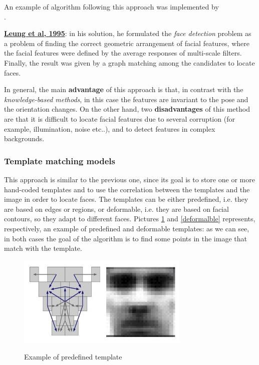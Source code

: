  An example of algorithm following this approach was implemented by \\ \cite{leung1995finding}. 
 
 \underline{\textbf{Leung et al, 1995}}: in his solution, he formulated the \textit{face detection} problem as a problem of finding the correct geometric arrangement of facial features, where the facial features were defined by the average responses of multi-scale filters. Finally, the result was given by a graph matching among the candidates to locate faces.

In general, the main \textbf{advantage} of this approach is that, in contrast with the \textit{knowledge-based methods}, in this case the features are invariant to the pose and the orientation changes. On the other hand, two \textbf{disadvantages} of this method are that it is difficult to locate facial features due to several corruption (for example, illumination, noise etc..), and to detect features in complex backgrounds.

\subsubsection{Template matching models}
This approach is similar to the previous one, since its goal is to store one or more hand-coded templates and to use the correlation between the templates and the image in order to locate faces. The templates can be either predefined, i.e. they are based on edges or regions, or deformable, i.e. they are based on facial contours, so they adapt to different faces. Pictures \ref{predefined} and \ref{deformalble} represents, respectively, an example of predefined and deformable templates: as we can see, in both cases the goal of the algorithm is to find some points in the image that match with the template.

\begin{figure}[h!]
		\centering
		\includegraphics[scale = 1.5]{img/predefined.jpg}
        \label{predefined}
        \caption{Example of predefined template}
\end{figure}

